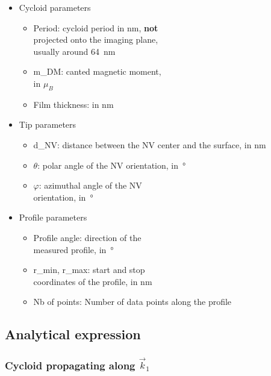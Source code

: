\documentclass[a4paper,12pt]{article}
\begin{document}
\begin{itemize}
\item Cycloid parameters
  \begin{itemize}
  \item Period: cycloid period in \si{\nano\meter}, \textbf{not}\\ projected onto the imaging plane,\\ usually around \SI{64}{\nano\meter}
  \item m\_DM: canted magnetic moment,\\ in $\mu_B$
  \item Film thickness: in \si{\nano\meter}
  \end{itemize}
  
\item Tip parameters
  \begin{itemize}
  \item d\_NV: distance between the NV center and the surface, in \si{\nano\meter}
  \item $\theta$: polar angle of the NV orientation, in~°
  \item $\varphi$: azimuthal angle of the NV\\ orientation, in~°
  \end{itemize}
 
\item Profile parameters
  \begin{itemize}
  \item Profile angle: direction of the\\ measured profile, in~°
  \item r\_min, r\_max: start and stop \\coordinates of the profile, in \si{\nano\meter}
  \item Nb of points: Number of data points along the profile
  \end{itemize}
\end{itemize}

\vspace*{3mm}

\subsection{Analytical expression}

\subsubsection{Cycloid propagating along $\vec{k}_1$}
\end{document}
